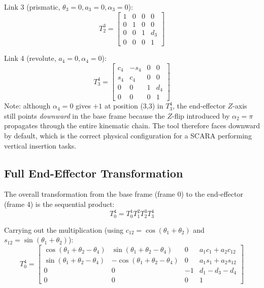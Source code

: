 \documentclass{article}
\begin{document}
Link 3 (prismatic, $\theta_3 = 0, a_3 = 0, \alpha_3 = 0$):
\begin{equation}
T_2^3 = \begin{bmatrix} 1 & 0 & 0 & 0 \\ 0 & 1 & 0 & 0 \\ 0 & 0 & 1 & d_3 \\ 0 & 0 & 0 & 1 \end{bmatrix} \tag{3.4}
\end{equation}

Link 4 (revolute, $a_4 = 0, \alpha_4 = 0$):
\begin{equation}
T_3^4 = \begin{bmatrix} c_4 & -s_4 & 0 & 0 \\ s_4 & c_4 & 0 & 0 \\ 0 & 0 & 1 & d_4 \\ 0 & 0 & 0 & 1 \end{bmatrix} \tag{3.5}
\end{equation}
Note: although $\alpha_4 = 0$ gives $+1$ at position (3,3) in $T_3^4$, the end-effector $Z$-axis still points \textit{downward} in the base frame because the $Z$-flip introduced by $\alpha_2 = \pi$ propagates through the entire kinematic chain. The tool therefore faces downward by default, which is the correct physical configuration for a SCARA performing vertical insertion tasks.


\subsection{Full End-Effector Transformation}
The overall transformation from the base frame (frame 0) to the end-effector (frame 4) is the sequential product:
\begin{equation}
T_0^4 = T_0^1 T_1^2 T_2^3 T_3^4 \tag{3.6}
\end{equation}

Carrying out the multiplication (using $c_{12} = \cos(\theta_1+\theta_2)$ and $s_{12} = \sin(\theta_1+\theta_2)$):
\begin{equation}
T_0^4 = \begin{bmatrix} \cos(\theta_1+\theta_2-\theta_4) & \sin(\theta_1+\theta_2-\theta_4) & 0 & a_1 c_1 + a_2 c_{12} \\ \sin(\theta_1+\theta_2-\theta_4) & -\cos(\theta_1+\theta_2-\theta_4) & 0 & a_1 s_1 + a_2 s_{12} \\ 0 & 0 & -1 & d_1 - d_3 - d_4 \\ 0 & 0 & 0 & 1 \end{bmatrix} \tag{3.7}
\end{equation}
\end{document}
